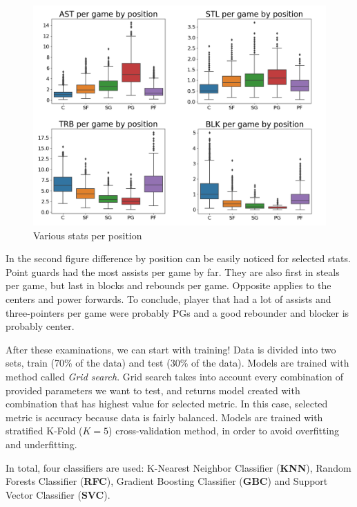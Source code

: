 \documentclass[a4paper]{article}
\begin{document}
\begin{figure}[h!]
\begin{center}
\includegraphics[width=1\textwidth]{per_pos_ast_stl_trb_blk.png}
\end{center}
\caption{Various stats per position}
\label{plt:pos_clf_data_boxplt2}
\end{figure}

In the second figure difference by position can be easily noticed for selected stats. Point guards had the most assists per game by far. They are also first in steals per game, but last in blocks and rebounds per game. Opposite applies to the centers and power forwards. To conclude, player that had a lot of assists and three-pointers per game were probably PGs and a good rebounder and blocker is probably center.

After these examinations, we can start with training! Data is divided into two sets, train (70\% of the data) and test (30\% of the data). Models are trained with method called \textit{Grid search}. Grid search takes into account every combination of provided parameters we want to test, and returns model created with combination that has highest value for selected metric. In this case, selected metric is accuracy because data is fairly balanced. Models are trained with stratified K-Fold ($K = 5$) \cite{crossVal} cross-validation method, in order to avoid overfitting and underfitting.

In total, four classifiers are used: K-Nearest Neighbor Classifier (\textbf{KNN}), Random Forests Classifier (\textbf{RFC}), Gradient Boosting Classifier (\textbf{GBC}) and Support Vector Classifier (\textbf{SVC}).
\end{document}
